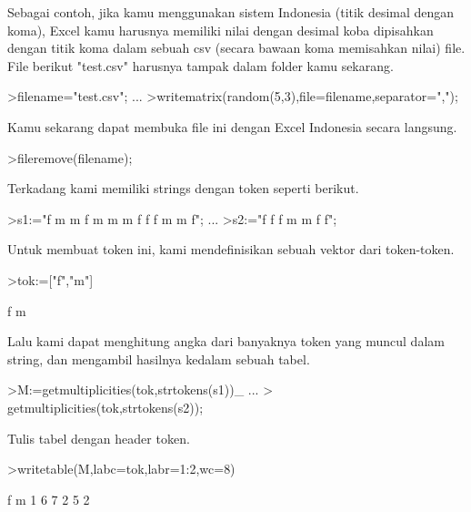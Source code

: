 \documentclass[a4paper,10pt]{article}
\begin{document}
\begin{eulernotebook}
\begin{eulercomment}
\begin{eulercomment}
\begin{eulercomment}
\begin{eulercomment}
\begin{eulercomment}
\begin{eulercomment}
\begin{eulercomment}
Sebagai contoh, jika kamu menggunakan sistem Indonesia (titik desimal
dengan koma), Excel kamu harusnya memiliki nilai dengan desimal koba
dipisahkan dengan titik koma dalam sebuah csv (secara bawaan koma
memisahkan nilai) file. File berikut "test.csv" harusnya tampak dalam
folder kamu sekarang.
\end{eulercomment}
\begin{eulerprompt}
>filename="test.csv"; ...
>writematrix(random(5,3),file=filename,separator=",");
\end{eulerprompt}
\begin{eulercomment}
Kamu sekarang dapat membuka file ini dengan Excel Indonesia secara
langsung.
\end{eulercomment}
\begin{eulerprompt}
>fileremove(filename);
\end{eulerprompt}
\begin{eulercomment}
Terkadang kami memiliki strings dengan token seperti berikut.
\end{eulercomment}
\begin{eulerprompt}
>s1:="f m m f m m m f f f m m f";  ...
>s2:="f f f m m f f";
\end{eulerprompt}
\begin{eulercomment}
Untuk membuat token ini, kami mendefinisikan sebuah vektor dari
token-token.
\end{eulercomment}
\begin{eulerprompt}
>tok:=["f","m"]
\end{eulerprompt}
\begin{euleroutput}
  f
  m
\end{euleroutput}
\begin{eulercomment}
Lalu kami dapat menghitung angka dari banyaknya token yang muncul
dalam string, dan mengambil hasilnya kedalam sebuah tabel.
\end{eulercomment}
\begin{eulerprompt}
>M:=getmultiplicities(tok,strtokens(s1))_ ...
>  getmultiplicities(tok,strtokens(s2));
\end{eulerprompt}
\begin{eulercomment}
Tulis tabel dengan header token.
\end{eulercomment}
\begin{eulerprompt}
>writetable(M,labc=tok,labr=1:2,wc=8)
\end{eulerprompt}
\begin{euleroutput}
                 f       m
         1       6       7
         2       5       2

\end{euleroutput}
\end{eulercomment}
\end{eulercomment}
\end{eulercomment}
\end{eulercomment}
\end{eulercomment}
\end{eulercomment}
\end{eulernotebook}
\end{document}
